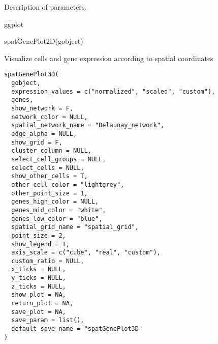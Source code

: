 \documentclass[a4paper]{book}
\begin{document}
%
\begin{Details}\relax
Description of parameters.
\end{Details}
%
\begin{Value}
ggplot
\end{Value}
%
\begin{SeeAlso}\relax
{}
\end{SeeAlso}
%
\begin{Examples}
\begin{ExampleCode}
    spatGenePlot2D(gobject)
\end{ExampleCode}
\end{Examples}
%
\begin{Description}\relax
Visualize cells and gene expression according to spatial coordinates
\end{Description}
%
\begin{Usage}
\begin{verbatim}
spatGenePlot3D(
  gobject,
  expression_values = c("normalized", "scaled", "custom"),
  genes,
  show_network = F,
  network_color = NULL,
  spatial_network_name = "Delaunay_network",
  edge_alpha = NULL,
  show_grid = F,
  cluster_column = NULL,
  select_cell_groups = NULL,
  select_cells = NULL,
  show_other_cells = T,
  other_cell_color = "lightgrey",
  other_point_size = 1,
  genes_high_color = NULL,
  genes_mid_color = "white",
  genes_low_color = "blue",
  spatial_grid_name = "spatial_grid",
  point_size = 2,
  show_legend = T,
  axis_scale = c("cube", "real", "custom"),
  custom_ratio = NULL,
  x_ticks = NULL,
  y_ticks = NULL,
  z_ticks = NULL,
  show_plot = NA,
  return_plot = NA,
  save_plot = NA,
  save_param = list(),
  default_save_name = "spatGenePlot3D"
)
\end{verbatim}
\end{Usage}
%
\end{document}
